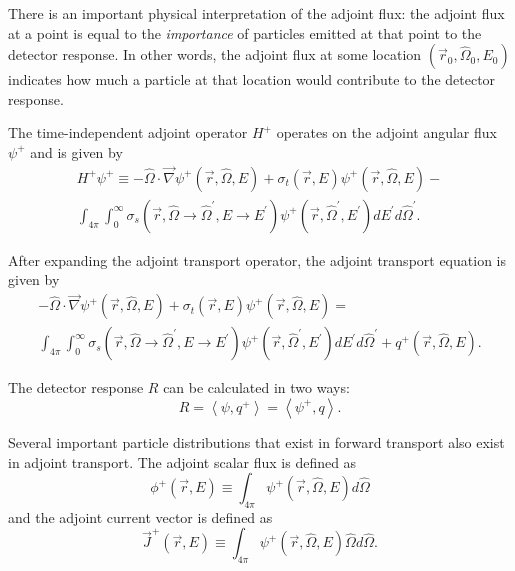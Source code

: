There is an important physical interpretation of the adjoint flux: the adjoint flux at a point is equal to the \textit{importance} of particles emitted at that point to the detector response.
In other words, the adjoint flux at some location $\left(\vec{r}_0, \hat{\Omega}_0, E_0\right)$ indicates how much a particle at that location would contribute to the detector response.

The time-independent adjoint operator $H^+$ operates on the adjoint angular flux $\psi^+$ and is given by
\begin{multline}\label{eq:bg:rt:adjoint_transport_operator}
  H^+\psi^+ \equiv
  -\hat{\Omega}\cdot\vec{\nabla}\psi^+\left(\vec{r},\hat{\Omega},E\right) +
  \sigma_t\left(\vec{r},E\right)\psi^+\left(\vec{r},\hat{\Omega},E\right) - \\
  \int_{4\pi}\int_0^\infty\sigma_s\left(\vec{r},\hat{\Omega}\rightarrow\hat{\Omega}^\prime,E\rightarrow E^\prime\right)\psi^+\left(\vec{r},\hat{\Omega}^\prime,E^\prime\right)dE^\prime d\hat{\Omega}^\prime.
\end{multline}

After expanding the adjoint transport operator, the adjoint transport equation is given by
\begin{multline}\label{eq:bg:rt:adjoint_transport_equation}
  -\hat{\Omega}\cdot\vec{\nabla}\psi^+\left(\vec{r},\hat{\Omega},E\right) +
  \sigma_t\left(\vec{r},E\right)\psi^+\left(\vec{r},\hat{\Omega},E\right) = \\
  \int_{4\pi}\int_0^\infty\sigma_s\left(\vec{r},\hat{\Omega}\rightarrow\hat{\Omega}^\prime,E\rightarrow E^\prime\right)\psi^+\left(\vec{r},\hat{\Omega}^\prime,E^\prime\right)dE^\prime d\hat{\Omega}^\prime +
  q^+\left(\vec{r},\hat{\Omega},E\right).
\end{multline}

The detector response $R$ can be calculated in two ways:
\begin{equation}\label{eq:bg:rt:detector_response}
  R = \left<\psi,q^+\right>
    = \left<\psi^+,q\right>.
\end{equation}

Several important particle distributions that exist in forward transport also exist in adjoint transport.
The adjoint scalar flux is defined as
\begin{equation}\label{eq:bg:rt:adjoint_scalar_flux}
  \phi^+\left(\vec{r},E\right) \equiv
  \int_{4\pi}\psi^+\left(\vec{r},\hat{\Omega},E\right)d\hat{\Omega}
\end{equation}
and the adjoint current vector is defined as
\begin{equation}\label{eq:bg:rt:adjoint_current_vector}
  \vec{J}^+\left(\vec{r},E\right) \equiv
  \int_{4\pi}\psi^+\left(\vec{r},\hat{\Omega},E\right)\hat{\Omega} d\hat{\Omega}.
\end{equation}

